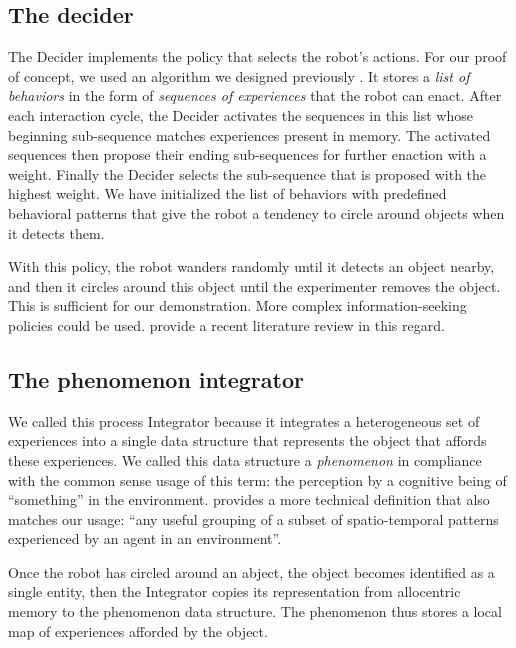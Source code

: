 \documentclass[pmlr]{jmlr}%
\begin{document}
\subsection{The decider}
\label{sec:decider}

The Decider implements the policy that selects the robot's actions. 
For our proof of concept, we used an algorithm we designed previously \citep{georgeon_eca_2013}.
It stores a \textit{list of behaviors} in the form of \textit{sequences of experiences} that the robot can enact. 
After each interaction cycle, the Decider activates the sequences in this list whose beginning sub-sequence matches experiences present in memory. 
The activated sequences then propose their ending sub-sequences for further enaction with a weight. 
Finally the Decider selects the sub-sequence that is proposed with the highest weight. 
We have initialized the list of behaviors with predefined behavioral patterns that give the robot a tendency to circle around objects when it detects them. 

With this policy, the robot wanders randomly until it detects an object nearby, and then it circles around this object until the experimenter removes the object. 
This is sufficient for our demonstration. 
More complex information-seeking policies could be used. 
\cite{gottlieb_towards_2018} provide a recent literature review in this regard. 

\subsection{The phenomenon integrator}

We called this process Integrator because it integrates a heterogeneous set of experiences into a single data structure that represents the object that affords these experiences. 
We called this data structure a \textit{phenomenon} in compliance with the common sense usage of this term: the perception by a cognitive being of ``something'' in the environment.
\cite{thorisson_explanation_2021} provides a more technical definition that also matches our usage: ``any useful grouping of a subset of spatio-temporal patterns experienced by an agent in an environment''.


Once the robot has circled around an abject, the object becomes identified as a single entity, then the Integrator copies its representation from allocentric memory to the phenomenon data structure.
The phenomenon thus stores a local map of experiences afforded by the object. 
\end{document}

